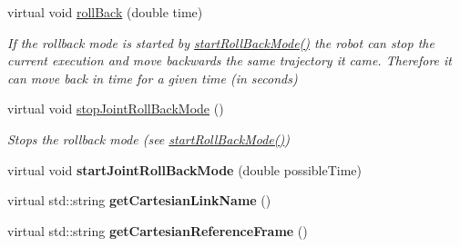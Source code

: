 \begin{DoxyCompactItemize}
virtual void \hyperlink{classkukadu_1_1PlottingControlQueue_a85c659edfd047f21763825b14776e723}{roll\+Back} (double time)
\begin{DoxyCompactList}\small\item\em If the rollback mode is started by \hyperlink{classkukadu_1_1ControlQueue_acb6ba5c61e9c26dcaa8e4073946e3791}{start\+Roll\+Back\+Mode()} the robot can stop the current execution and move backwards the same trajectory it came. Therefore it can move back in time for a given time (in seconds) \end{DoxyCompactList}\item 
virtual void \hyperlink{classkukadu_1_1PlottingControlQueue_acc0ddc988115f5904764cd223941f1f5}{stop\+Joint\+Roll\+Back\+Mode} ()\hypertarget{classkukadu_1_1PlottingControlQueue_acc0ddc988115f5904764cd223941f1f5}{}\label{classkukadu_1_1PlottingControlQueue_acc0ddc988115f5904764cd223941f1f5}

\begin{DoxyCompactList}\small\item\em Stops the rollback mode (see \hyperlink{classkukadu_1_1ControlQueue_acb6ba5c61e9c26dcaa8e4073946e3791}{start\+Roll\+Back\+Mode()}) \end{DoxyCompactList}\item 
virtual void {\bfseries start\+Joint\+Roll\+Back\+Mode} (double possible\+Time)\hypertarget{classkukadu_1_1PlottingControlQueue_afd0414e6d232da5fb241d61b6e37f350}{}\label{classkukadu_1_1PlottingControlQueue_afd0414e6d232da5fb241d61b6e37f350}

\item 
virtual std\+::string {\bfseries get\+Cartesian\+Link\+Name} ()\hypertarget{classkukadu_1_1PlottingControlQueue_ace31af60df8f18defb78c1412fc7f400}{}\label{classkukadu_1_1PlottingControlQueue_ace31af60df8f18defb78c1412fc7f400}

\item 
virtual std\+::string {\bfseries get\+Cartesian\+Reference\+Frame} ()\hypertarget{classkukadu_1_1PlottingControlQueue_ac80bd9d14352d784a020f45eeeccec38}{}\label{classkukadu_1_1PlottingControlQueue_ac80bd9d14352d784a020f45eeeccec38}

\end{DoxyCompactItemize}
